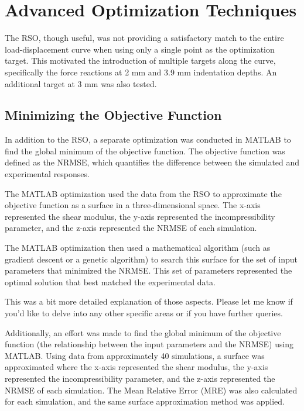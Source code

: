 \section{Advanced Optimization Techniques}

The RSO, though useful, was not providing a satisfactory match to the entire load-displacement curve when using only a single point as the optimization target. This motivated the introduction of multiple targets along the curve, specifically the force reactions at 2 mm and 3.9 mm indentation depths. An additional target at 3 mm was also tested.

\subsection{Minimizing the Objective Function}

In addition to the RSO, a separate optimization was conducted in MATLAB to find the global minimum of the objective function. The objective function was defined as the NRMSE, which quantifies the difference between the simulated and experimental responses.

The MATLAB optimization used the data from the RSO to approximate the objective function as a surface in a three-dimensional space. The x-axis represented the shear modulus, the y-axis represented the incompressibility parameter, and the z-axis represented the NRMSE of each simulation.

The MATLAB optimization then used a mathematical algorithm (such as gradient descent or a genetic algorithm) to search this surface for the set of input parameters that minimized the NRMSE. This set of parameters represented the optimal solution that best matched the experimental data.

This was a bit more detailed explanation of those aspects. Please let me know if you'd like to delve into any other specific areas or if you have further queries.


Additionally, an effort was made to find the global minimum of the objective function (the relationship between the input parameters and the NRMSE) using MATLAB. Using data from approximately 40 simulations, a surface was approximated where the x-axis represented the shear modulus, the y-axis represented the incompressibility parameter, and the z-axis represented the NRMSE of each simulation. The Mean Relative Error (MRE) was also calculated for each simulation, and the same surface approximation method was applied.

